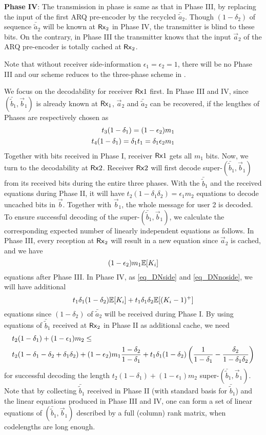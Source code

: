 \noindent \textbf{Phase IV}: The transmission in phase is same as that in Phase III, by replacing the input of the first ARQ pre-encoder by the recycled $\bar{\tilde{a}}_2$. Though $(1-\delta_2)$ of sequence $\bar{\tilde{a}}_2$ will be known at $\mathsf{Rx}_2$ in Phase IV, the transmitter is blind to these bits. On the contrary, in Phase III the transmitter knows that the input $\vec{a}_2$ of the ARQ pre-encoder is totally cached at $\mathsf{Rx}_2$.

\noindent Note that without receiver side-information $\epsilon_1 = \epsilon_2 =1$, there will be no Phase III and our scheme reduces to the three-phase scheme in \cite{lin2019no}.

We focus on the decodability for receiver $\mathsf{Rx}1$ first. In Phase III and IV, since $(\bar{\tilde{b}}_1,\vec{b}_1)$ is already known at $\mathsf{Rx}_1$, $\vec{a}_2$ and $\bar{\tilde{a}}_2$ can be recovered, if the lengthes of Phases are respectively chosen as
\begin{align}
t_3 (1-\delta_1) = (1-\epsilon_2) m_1 \notag \\
t_4 (1-\delta_1) = \delta_1 t_1 = \delta_1 \epsilon_2 m_1 \label{eq_DNcachet34}
\end{align}
Together with bits received in Phase I, receiver $\mathsf{Rx}1$ gets
all $m_1$ bits. Now, we turn to the decodability at $\mathsf{Rx}2$.
Receiver $\mathsf{Rx}2$ will first decode
super-$(\bar{\tilde{b}}_1,\vec{b}_1)$ from its received bits
during the entire three phases. With the $\bar{\tilde{b}}_1$ and
the received equations during Phase II, it will have
$t_2(1-\delta_1\delta_2)=\epsilon_1 m_2$ equations to decode
uncached bits in $\vec{b}$. Together with $\vec{b}_1$, the whole
message for user 2 is decoded. To ensure successful decoding of
the super-$(\bar{\tilde{b}}_1,\vec{b}_1)$, we calculate the
corresponding expected number of linearly independent equations as
follows. In Phase III, every reception at $\mathsf{Rx}_2$ will result
in a new equation since $\vec{a}_2$ is cached, and we have
\[
(1-\epsilon_2)m_1 \mathbb{E}[K_i]
\]
equations after Phase III. In Phase IV, as \eqref{eq_DNside} and
\eqref{eq_DNnoside}, we will have additional
\[
t_1 \delta_1(1-\delta_2) \mathbb{E}[K_i]+ t_1 \delta_1\delta_2
\mathbb{E}[(K_i-1)^+]
\]
equations since $(1-\delta_2)$ of $\bar{\tilde{a}}_2$ will be
received during Phase I. By using equations of $\bar{\tilde{b}}_1$
received at $\mathsf{Rx}_2$ in Phase II as additional cache, we need
\begin{align}
&t_2(1-\delta_1)+(1-\epsilon_1)m_2  \leq \notag \\
&t_2(1-\delta_1-\delta_2+\delta_{1}\delta_2)+ (1-\epsilon_2)m_1
\frac{1-\delta_2}{1-\delta_1}+ t_1 \delta_1(1-\delta_2) \left(
\frac{1}{1-\delta_1}-\frac{\delta_2}{1-\delta_1\delta_2} \right)
\label{eq_DNcacheRx2Dec}
\end{align}
for successful decoding the length
$t_2(1-\delta_1)+(1-\epsilon_1)m_2$
super-$(\bar{\tilde{b}}_1,\vec{b}_1)$. Note that by collecting
$\bar{\tilde{b}}_1$ received in Phase II (with standard basis for
$\bar{\tilde{b}}_1$) and the linear equations produced in Phase III
and IV, one can form a set of linear equations of
$(\bar{\tilde{b}}_1,\vec{b}_1)$ described by a full (column) rank
matrix, when codelengths are long enough.

